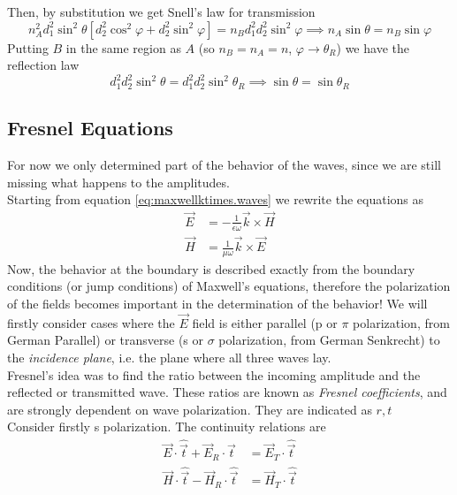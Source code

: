 \documentclass[../electromagnetism.tex]{subfiles}
\begin{document}
Then, by substitution we get Snell's law for transmission
\begin{equation*}
	n_A^2d_1^2\sin^2\theta\left[ d_2^2\cos^2\varphi+d_2^2\sin^2\varphi \right]=n_Bd_1^2d_2^2\sin^2\varphi\implies n_A\sin\theta=n_B\sin\varphi
\end{equation*}
Putting $B$ in the same region as $A$ (so $n_B=n_A=n$, $\varphi\to\theta_R$) we have the reflection law
\begin{equation}
	d_1^2d_2^2\sin^2\theta=d_1^2d_2^2\sin^2\theta_R\implies\sin\theta=\sin\theta_R
	\label{eq:snellfermat-rf.ref}
\end{equation}
\subsection{Fresnel Equations}
For now we only determined part of the behavior of the waves, since we are still missing what happens to the amplitudes.\\
Starting from equation \eqref{eq:maxwellktimes.waves} we rewrite the equations as
\begin{equation}
	\begin{aligned}
		\vec{E}&= -\frac{1}{\epsilon\omega}\vec{k}\times\vec{H}\\
		\vec{H}&= \frac{1}{\mu\omega}\vec{k}\times\vec{E}
	\end{aligned}
	\label{eq:maxwellktimes.ref}
\end{equation}
Now, the behavior at the boundary is described exactly from the boundary conditions (or jump conditions) of Maxwell's equations, therefore the polarization of the fields becomes important in the determination of the behavior! We will firstly consider cases where the $\vec{E}$ field is either parallel (p or $\pi$ polarization, from German Parallel) or transverse (s or $\sigma$ polarization, from German Senkrecht) to the \textit{incidence plane}, i.e. the plane where all three waves lay.\\
Fresnel's idea was to find the ratio between the incoming amplitude and the reflected or transmitted wave. These ratios are known as \textit{Fresnel coefficients}, and are strongly dependent on wave polarization. They are indicated as $r, t$\\
Consider firstly s polarization. The continuity relations are
\begin{equation}
	\begin{aligned}
		\vec{E}\cdot\hat{\vec{t}}+\vec{E}_R\cdot\hat{\vec{t}}&= \vec{E}_T\cdot\hat{\vec{t}}\\
		\vec{H}\cdot\hat{\vec{t}}-\vec{H}_R\cdot\hat{\vec{t}}&= \vec{H}_T\cdot\hat{\vec{t}}
	\end{aligned}
	\label{eq:spol-cont.ref}
\end{equation}
\end{document}
